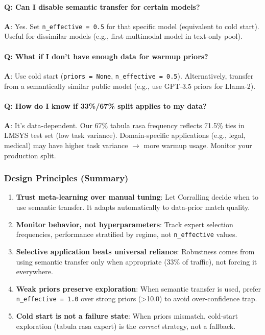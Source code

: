 \paragraph{Q: Can I disable semantic transfer for certain models?}
\textbf{A}: Yes. Set \texttt{n\_effective = 0.5} for that specific model (equivalent to cold start). Useful for dissimilar models (e.g., first multimodal model in text-only pool).

\paragraph{Q: What if I don't have enough data for warmup priors?}
\textbf{A}: Use cold start (\texttt{priors = None}, \texttt{n\_effective = 0.5}). Alternatively, transfer from a semantically similar public model (e.g., use GPT-3.5 priors for Llama-2).

\paragraph{Q: How do I know if 33\%/67\% split applies to my data?}
\textbf{A}: It's data-dependent. Our 67\% tabula rasa frequency reflects 71.5\% ties in LMSYS test set (low task variance). Domain-specific applications (e.g., legal, medical) may have higher task variance $\to$ more warmup usage. Monitor your production split.


\subsubsection{Design Principles (Summary)}

\begin{enumerate}[leftmargin=*, itemsep=2pt]
    \item \textbf{Trust meta-learning over manual tuning}: Let Corralling decide when to use semantic transfer. It adapts automatically to data-prior match quality.
    
    \item \textbf{Monitor behavior, not hyperparameters}: Track expert selection frequencies, performance stratified by regime, not \texttt{n\_effective} values.
    
    \item \textbf{Selective application beats universal reliance}: Robustness comes from using semantic transfer only when appropriate (33\% of traffic), not forcing it everywhere.
    
    \item \textbf{Weak priors preserve exploration}: When semantic transfer is used, prefer \texttt{n\_effective = 1.0} over strong priors (>10.0) to avoid over-confidence trap.
    
    \item \textbf{Cold start is not a failure state}: When priors mismatch, cold-start exploration (tabula rasa expert) is the \textit{correct} strategy, not a fallback.
\end{enumerate}

